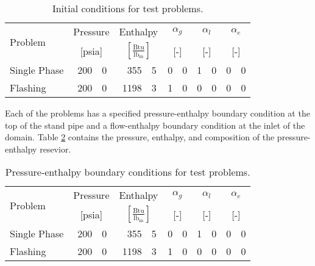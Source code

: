 \begin{table}[h!t]
\centering
\begin{tabular}{@{}lr@{.}lr@{.}lr@{.}lr@{.}lr@{.}l@{}} \toprule
\multirow{2}{*}{Problem} & \multicolumn{2}{c}{Pressure} & \multicolumn{2}{c}{Enthalpy}             & \multicolumn{2}{c}{$\alpha_g$} & \multicolumn{2}{c}{$\alpha_l$} & \multicolumn{2}{c}{$\alpha_e$} \\ 
                         & \multicolumn{2}{c}{[psia]} & \multicolumn{2}{c}{$[\frac{\text{Btu}}{\text{lb}_{\text{m}}}]$} & \multicolumn{2}{c}{[-]}      & \multicolumn{2}{c}{[-]}      & \multicolumn{2}{c}{[-]}      \\ \midrule
Single Phase             &  200&0                       &  355&5                                   & 0&0                            & 1&0                            & 0&0 \\
Flashing                 &  200&0                       & 1198&3                                   & 1&0                            & 0&0                            & 0&0 \\ \bottomrule  
\end{tabular}
\caption{Initial conditions for test problems.}
\label{tab:ic}
\end{table}

Each of the problems has a specified pressure-enthalpy boundary condition at the top of the stand pipe and a flow-enthalpy boundary condition at the inlet of the domain.
Table \ref{tab:bc_pe} contains the pressure, enthalpy, and composition of the pressure-enthalpy resevior. 

\begin{table}[h!t]
\centering
\begin{tabular}{@{}lr@{.}lr@{.}lr@{.}lr@{.}lr@{.}l@{}} \toprule
\multirow{2}{*}{Problem} & \multicolumn{2}{c}{Pressure} & \multicolumn{2}{c}{Enthalpy}             & \multicolumn{2}{c}{$\alpha_g$} & \multicolumn{2}{c}{$\alpha_l$} & \multicolumn{2}{c}{$\alpha_e$} \\ 
                         & \multicolumn{2}{c}{[psia]} & \multicolumn{2}{c}{$[\frac{\text{Btu}}{\text{lb}_{\text{m}}}]$} & \multicolumn{2}{c}{[-]}      & \multicolumn{2}{c}{[-]}      & \multicolumn{2}{c}{[-]}      \\ \midrule
Single Phase             &  200&0                       &  355&5                                   & 0&0                            & 1&0                            & 0&0 \\
Flashing                 &  200&0                       & 1198&3                                   & 1&0                            & 0&0                            & 0&0 \\ \bottomrule  
\end{tabular}
\caption{Pressure-enthalpy boundary conditions for test problems.}
\label{tab:bc_pe}
\end{table}

